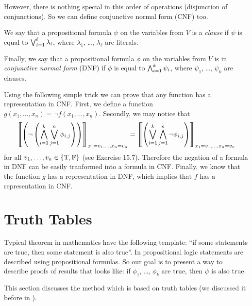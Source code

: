 However, there is nothing special in this order of operations (disjunction of
conjunctions). So we can define conjunctive normal form (CNF) too.
\begin{definition}
  We say that a propositional formula $\psi$ on the variables from $V$ is
  a \emph{clause} if $\psi$ is equal to $\bigvee_{i = 1}^\ell \lambda_i$, where
  $\lambda_1$, \dots, $\lambda_\ell$ are literals.

  Finally, we say that a propositional formula $\phi$ on the variables from
  $V$ is in \emph{conjunctive normal form} (DNF) if $\phi$ is equal to
  $\bigwedge_{i = 1}^k \psi_i$, where $\psi_1$, \dots, $\psi_k$ are
  clauses.
\end{definition}

Using the following simple trick we can prove that any function
has a representation in CNF. First, we define a function
$g(x_1, \dots, x_n) = \lnot f(x_1, \dots, x_n)$. Secondly, we may notice that
\[
  \left\llbracket {
    \left(
      \lnot
      \left(
        \bigwedge_{i = 1}^k \bigvee_{j = 1}^n \phi_{i, j}
      \right)
    \right)
  } \right\rrbracket_{x_1 = v_1, \dots, x_n = v_n}
  =
  \left\llbracket {
    \left(
      \bigvee_{i = 1}^k \bigwedge_{j = 1}^n \lnot \phi_{i, j}
    \right)
  } \right\rrbracket_{x_1 = v_1, \dots, x_n = v_n}
\]
for all $v_1, \dots, v_n \in \set{\ltrue, \lfalse}$
(see Exercise 15.7). Therefore the negation
of a formula in DNF can be easily tranformed into a formula in CNF.
Finally, we know that the function
$g$ has a representation in DNF, which implies that $f$ has a representation
in CNF.

\section{Truth Tables}
\label{section:truth-tables}

Typical theorem in mathematics have the following template:
``if some statements are true, then some statement is also true''.
In propositional logic statements are described using propositional formulas.
So our goal is to present a way to describe proofs of results that looks like:
if $\phi_1$, \dots, $\phi_k$ are true, then $\psi$ is also true.

This section discusses the method which is based on truth tables (we discussed
it before in ).

